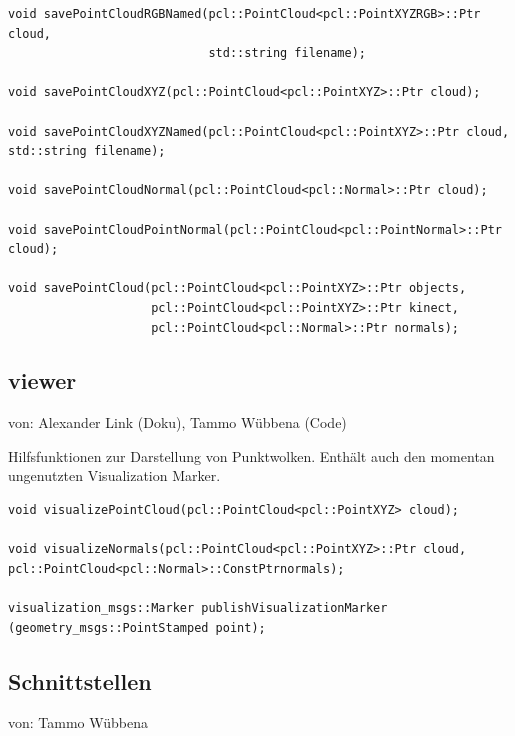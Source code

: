 \documentclass{suturo}
\makeatletter
\newcommand{\chapterauthor}[1]{%
  {\parindent0pt\vspace*{-27pt}%
  \linespread{0}\small\begin{flushright}von: #1\end{flushright}%
  \par\nobreak\vspace*{0pt}}
  \@afterheading%
}
\makeatother
\begin{document}
\begin{verbatim}
void savePointCloudRGBNamed(pcl::PointCloud<pcl::PointXYZRGB>::Ptr cloud,
                            std::string filename);
                            
void savePointCloudXYZ(pcl::PointCloud<pcl::PointXYZ>::Ptr cloud);

void savePointCloudXYZNamed(pcl::PointCloud<pcl::PointXYZ>::Ptr cloud,
std::string filename);

void savePointCloudNormal(pcl::PointCloud<pcl::Normal>::Ptr cloud);

void savePointCloudPointNormal(pcl::PointCloud<pcl::PointNormal>::Ptr cloud);

void savePointCloud(pcl::PointCloud<pcl::PointXYZ>::Ptr objects,
                    pcl::PointCloud<pcl::PointXYZ>::Ptr kinect,
                    pcl::PointCloud<pcl::Normal>::Ptr normals);
\end{verbatim}

\subsection*{viewer}
\chapterauthor{Alexander Link (Doku), Tammo Wübbena (Code)}
Hilfsfunktionen zur Darstellung von Punktwolken.
Enthält auch den momentan ungenutzten Visualization Marker.

\begin{verbatim}
void visualizePointCloud(pcl::PointCloud<pcl::PointXYZ> cloud);

void visualizeNormals(pcl::PointCloud<pcl::PointXYZ>::Ptr cloud,
pcl::PointCloud<pcl::Normal>::ConstPtrnormals);

visualization_msgs::Marker publishVisualizationMarker
(geometry_msgs::PointStamped point);
\end{verbatim}


\subsection{Schnittstellen}
\chapterauthor{Tammo Wübbena}
\end{document}
